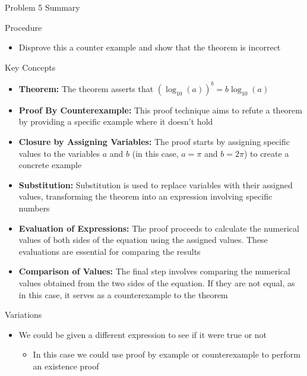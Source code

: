 \begin{summary}{Problem 5 Summary}
    \begin{statement}{Procedure}
        \begin{itemize}
            \item Disprove this a counter example and show that the theorem is incorrect
        \end{itemize}
    \end{statement}
    \begin{statement}{Key Concepts}
        \begin{itemize}
            \item \textbf{Theorem:} The theorem asserts that $(\log_{10}(a))^{b} = b \log_{10}{(a)}$
            \item \textbf{Proof By Counterexample:} This proof technique aims to refute a theorem by providing a specific example where it doesn't hold
            \item \textbf{Closure by Assigning Variables:} The proof starts by assigning specific values to the variables $a$ and $b$ (in this case, $a = \pi$ and $b = 2\pi$) to create a concrete example
            \item \textbf{Substitution:} Substitution is used to replace variables with their assigned values, transforming the theorem into an expression involving specific numbers
            \item \textbf{Evaluation of Expressions:} The proof proceeds to calculate the numerical values of both sides of the equation using the assigned values. These evaluations are essential for 
            comparing the results
            \item \textbf{Comparison of Values:} The final step involves comparing the numerical values obtained from the two sides of the equation. If they are not equal, as in this case, it serves as a 
            counterexample to the theorem
        \end{itemize}
    \end{statement}
    \begin{statement}{Variations}
        \begin{itemize}
            \item We could be given a different expression to see if it were true or not
            \begin{itemize}
                \item In this case we could use proof by example or counterexample to perform an existence proof
            \end{itemize}
        \end{itemize}
    \end{statement}
\end{summary}

